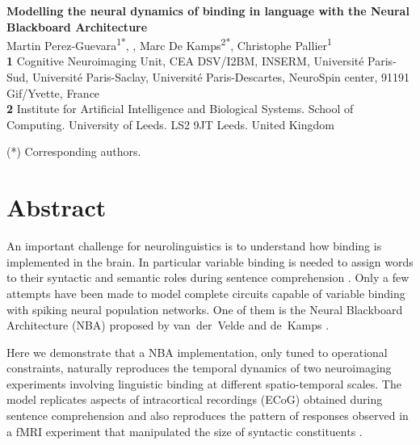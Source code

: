 \documentclass[10pt]{article}
\date{}
\begin{document}
\vspace*{0.2in}

\begin{flushleft} {\LARGE \textbf{Modelling the neural dynamics of
      binding in language with the Neural Blackboard Architecture} }
  \newline
  \\

  Martin Perez-Guevara\textsuperscript{1*}, , Marc De Kamps\textsuperscript{2*}, Christophe Pallier\textsuperscript{1}
  \\
  \bigskip \textbf{1} Cognitive Neuroimaging Unit, CEA DSV/I2BM,
  INSERM, Université Paris-Sud, Université Paris-Saclay,
  Université Paris-Descartes, NeuroSpin center, 91191 Gif/Yvette, France
  \\
  \textbf{2} Institute for Artificial Intelligence and Biological
  Systems. School of Computing. University of Leeds. LS2 9JT Leeds.
  United Kingdom
  \\
  \bigskip


(*) Corresponding authors.
  
\end{flushleft}


\section*{Abstract}

An important challenge for neurolinguistics is to understand how binding is implemented in the brain.
In particular variable binding is needed to assign words to their syntactic and semantic roles during sentence comprehension \cite{Jackendoff_2002b}.
Only a few attempts have been made to model complete circuits capable of variable binding with spiking neural population networks.
One of them is the Neural Blackboard Architecture (NBA) proposed by van~der~Velde and de~Kamps \cite{van_der_Velde_2006}.

Here we demonstrate that a NBA implementation, only tuned to operational constraints, naturally reproduces the temporal dynamics of two neuroimaging experiments involving linguistic binding at  different spatio-temporal scales.
The model replicates aspects of intracortical recordings (ECoG) obtained during sentence comprehension \cite{Nelson_2017} and also reproduces the pattern of responses observed in a fMRI experiment that manipulated the size of syntactic constituents \cite{Pallier_2011}.
\end{document}
